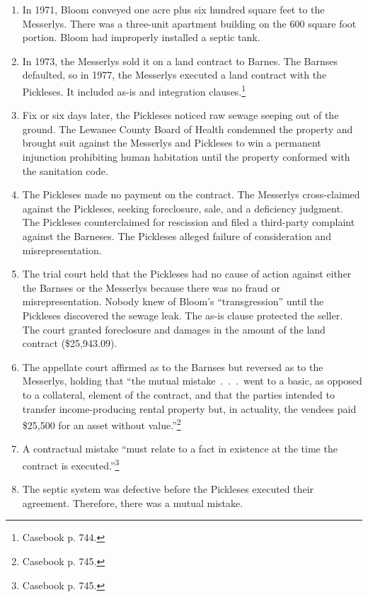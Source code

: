 \begin{enumerate}
    \item In 1971, Bloom conveyed one acre plus six hundred square feet to the 
    Messerlys. There was a three-unit apartment building on the 600 square 
    foot portion. Bloom had improperly installed a septic tank.
    \item In 1973, the Messerlys sold it on a land contract to Barnes. The 
    Barnses defaulted, so in 1977, the Messerlys executed a land contract with 
    the Pickleses. It included as-is and integration 
    clauses.\footnote{Casebook p. 744.}
    \item Fix or six days later, the Pickleses noticed raw sewage seeping out 
    of the ground. The Lewanee County Board of Health condemned the property 
    and brought suit against the Messerlys and Pickleses to win a permanent 
    injunction prohibiting human habitation until the property conformed with 
    the sanitation code.
    \item The Pickleses made no payment on the contract. The Messerlys 
    cross-claimed against the Pickleses, seeking foreclosure, sale, and a 
    deficiency judgment. The Pickleses counterclaimed for rescission and filed 
    a third-party complaint against the Barneses. The Pickleses alleged 
    failure of consideration and misrepresentation.
    \item The trial court held that the Pickleses had no cause of action 
    against either the Barnses or the Messerlys because there was no fraud or 
    misrepresentation. Nobody knew of Bloom's ``transgression'' until the 
    Pickleses discovered the sewage leak. The as-is clause protected the 
    seller. The court granted foreclosure and damages in the amount of the 
    land contract (\$25,943.09).
    \item The appellate court affirmed as to the Barnses but reversed as to 
    the Messerlys, holding that ``the mutual mistake~.~.~.~went to a basic, as 
    opposed to a collateral, element of the contract, and that the parties 
    intended to transfer income-producing rental property but, in actuality, 
    the vendees paid \$25,500 for an asset without value.''\footnote{Casebook 
    p. 745.}
    \item A contractual mistake ``must relate to a fact in existence at the 
    time the contract is executed.''\footnote{Casebook p. 745.}
    \item The septic system was defective before the Pickleses executed their 
    agreement. Therefore, there was a mutual mistake.

\end{enumerate}
